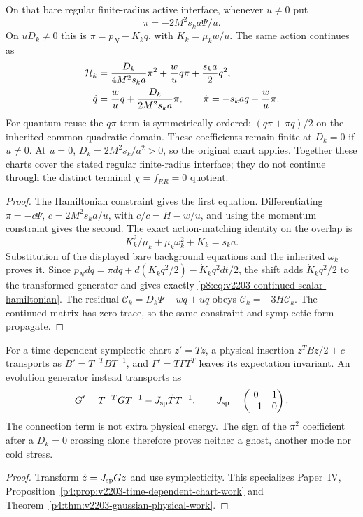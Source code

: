 \documentclass[12pt,a4paper]{article}
\begin{document}
\begin{theorem}[Canonical continuation through the $D_k=0$ chart locus]
\label{p8:thm:v2203-continued-scalar-atlas}
On that bare regular finite-radius active interface, whenever $u\ne0$ put
\[
 \pi=-2M^2s_ka\Psi/u.
\]
On $uD_k\ne0$ this is $\pi=p_N-K_kq$, with $K_k=\mu_kw/u$.
The same action continues as
\begin{align}
\label{p8:eq:v2203-continued-scalar-hamiltonian}
 {\cal H}_k&=\frac{D_k}{4M^2s_ka}\pi^2+\frac wu q\pi+\frac{s_ka}{2}q^2,\\
 \dot q&=\frac wu q+\frac{D_k}{2M^2s_ka}\pi,\qquad
 \dot\pi=-s_kaq-\frac wu\pi.\nonumber
\end{align}
For quantum reuse the $q\pi$ term is symmetrically ordered:
$(q\pi+\pi q)/2$ on the inherited common quadratic domain.
These coefficients remain finite at $D_k=0$ if $u\ne0$.
At $u=0$, $D_k=2M^2s_k/a^2>0$, so the original chart applies.
Together these charts cover the stated regular finite-radius interface;
they do not continue through the distinct terminal $\chi=f_{RR}=0$ quotient.
\end{theorem}
\begin{proof}
The Hamiltonian constraint gives the first equation. Differentiating
$\pi=-c\Psi$, $c=2M^2s_ka/u$, with $\dot c/c=H-w/u$, and using
the momentum constraint gives the second. The exact action-matching
identity on the overlap is
\begin{equation}
\label{p8:eq:v2203-canonical-shift-identity}
 \boxed{K_k^2/\mu_k+\mu_k\omega_k^2+\dot K_k=s_ka.}
\end{equation}
Substitution of the displayed bare background equations and the inherited
$\omega_k$ proves it. Since
$p_Ndq=\pi dq+d(K_kq^2/2)-\dot K_kq^2dt/2$, the shift adds
$\dot K_kq^2/2$ to the transformed generator and gives exactly
\eqref{p8:eq:v2203-continued-scalar-hamiltonian}.
The residual $\mathcal C_k=D_k\Psi-wq+u\dot q$ obeys
$\dot{\mathcal C}_k=-3H\mathcal C_k$. The continued matrix has zero trace,
so the same constraint and symplectic form propagate.
\end{proof}

\begin{corollary}
\label{p8:cor:v2203-chart-work-firewall}
For a time-dependent symplectic chart $z'=Tz$, a physical insertion
$z^TBz/2+c$ transports as $B'=T^{-T}BT^{-1}$, and
$\Gamma'=T\Gamma T^T$ leaves its expectation invariant.
An evolution generator instead transports as
\[
 G'=T^{-T}GT^{-1}-J_{\rm sp}\dot T T^{-1},
 \qquad J_{\rm sp}=\begin{pmatrix}0&1\\-1&0\end{pmatrix}.
\]
The connection term is not extra physical energy. The sign of the
$\pi^2$ coefficient after a $D_k=0$ crossing alone therefore proves
neither a ghost, another mode nor cold stress.
\end{corollary}
\begin{proof}
Transform $\dot z=J_{\rm sp}Gz$ and use symplecticity.
This specializes Paper~IV,
Proposition~\ref{p4:prop:v2203-time-dependent-chart-work} and
Theorem~\ref{p4:thm:v2203-gaussian-physical-work}.
\end{proof}
\end{document}
